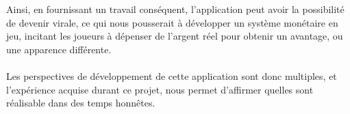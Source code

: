 Ainsi, en fournissant un travail conséquent, l'application peut avoir la possibilité  de devenir virale, ce qui nous pousserait à développer un système monétaire en jeu, incitant les joueurs à dépenser de l'argent réel pour obtenir un avantage, ou une apparence différente.

\paragraph{}
Les perspectives de développement de cette application sont donc multiples, et l'expérience acquise durant ce projet, nous permet d'affirmer quelles sont réalisable dans des temps honnêtes.



